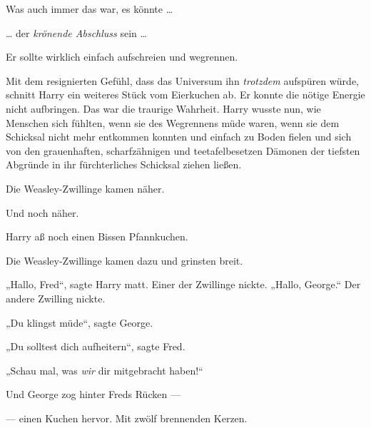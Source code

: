Was auch immer das war, es könnte …

… der \emph{krönende Abschluss} sein …

Er sollte wirklich einfach aufschreien und wegrennen.

Mit dem resignierten Gefühl, dass das Universum ihn \emph{trotzdem} aufspüren würde, schnitt Harry ein weiteres Stück vom Eierkuchen ab. Er konnte die nötige Energie nicht aufbringen. Das war die traurige Wahrheit. Harry wusste nun, wie Menschen sich fühlten, wenn sie des Wegrennens müde waren, wenn sie dem Schicksal nicht mehr entkommen konnten und einfach zu Boden fielen und sich von den grauenhaften, scharfzähnigen und teetafelbesetzen Dämonen der tiefsten Abgründe in ihr fürchterliches Schicksal ziehen ließen.

Die Weasley-Zwillinge kamen näher.

Und noch näher.

Harry aß noch einen Bissen Pfannkuchen.

Die Weasley-Zwillinge kamen dazu und grinsten breit.

„Hallo, Fred“, sagte Harry matt. Einer der Zwillinge nickte.
„Hallo, George.“ Der andere Zwilling nickte.

„Du klingst müde“, sagte George.

„Du solltest dich aufheitern“, sagte Fred.

„Schau mal, was \emph{wir} dir mitgebracht haben!“

Und George zog hinter Freds Rücken —

— einen Kuchen hervor. Mit zwölf brennenden Kerzen.

